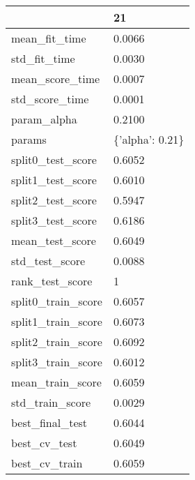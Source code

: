 \begin{tabular}{ll}
\toprule
{} &               21 \\
\midrule
mean\_fit\_time      &           0.0066 \\
std\_fit\_time       &           0.0030 \\
mean\_score\_time    &           0.0007 \\
std\_score\_time     &           0.0001 \\
param\_alpha        &           0.2100 \\
params             &  \{'alpha': 0.21\} \\
split0\_test\_score  &           0.6052 \\
split1\_test\_score  &           0.6010 \\
split2\_test\_score  &           0.5947 \\
split3\_test\_score  &           0.6186 \\
mean\_test\_score    &           0.6049 \\
std\_test\_score     &           0.0088 \\
rank\_test\_score    &                1 \\
split0\_train\_score &           0.6057 \\
split1\_train\_score &           0.6073 \\
split2\_train\_score &           0.6092 \\
split3\_train\_score &           0.6012 \\
mean\_train\_score   &           0.6059 \\
std\_train\_score    &           0.0029 \\
best\_final\_test    &           0.6044 \\
best\_cv\_test       &           0.6049 \\
best\_cv\_train      &           0.6059 \\
\bottomrule
\end{tabular}
